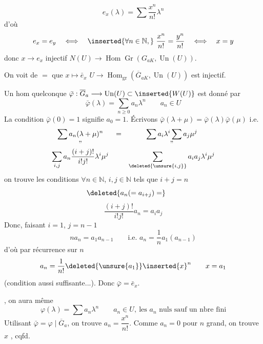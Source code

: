 \[
e_x(\lambda)=\sum\frac{x^n}{n!}\lambda^n
\]
d'où
\[
e_x=e_y\quad\Longleftrightarrow\quad\inserted{\forall n\in\mathbb{N},}\ \frac{x^n}{n!}=\frac{y^n}{n!}\quad\Longleftrightarrow\quad x=y
\]
donc $x\longrightarrow e_x$ injectif $N(U)\longrightarrow\operatorname{Hom}\operatorname{Gr}(G_{aK},\operatorname{Un}(U))$.

On voit de $=$ que $x\longmapsto\bar e_x$ $U\longrightarrow\operatorname{Hom}_{\mathrm{gr}}(\overline G_{aK},\operatorname{Un}(U))$ est injectif.

Un hom quelconque  $\bar\varphi:\overline G_a\longrightarrow\operatorname{Un}(U)\subset\inserted{W(U)}$ est donné par
\[
\bar\varphi(\lambda)=\sum_{n\geq0}a_n\lambda^n\qquad a_n\in U
\]
La condition $\bar\varphi(0)=1$ signifie $a_0=1$. Écrivons $\bar\varphi(\lambda+\mu)=\bar\varphi(\lambda)\bar\varphi(\mu)$ i.e.
\[
\begin{array}{ccc}
\displaystyle\sum a_n(\lambda+\mu)^n&=&\displaystyle\sum a_i\lambda^i\sum a_j\mu^j\\
\text{''}&&\text{''}\\
\displaystyle\sum_{i,j}a_n\frac{(i+j)!}{i!j!}\lambda^i\mu^j&&\displaystyle\sum_{\deleted{\unsure{i,j}}}a_i a_j\lambda^i\mu^j
\end{array}
\]
on trouve les conditions $\forall n\in\mathbb{N}$, $i,j\in\mathbb{N}$ tels que $i+j=n$
\[
\deleted{a_n(=a_{i+j})=}\qquad
\]
\[
\frac{(i+j)!}{i!j!}a_n=a_i a_j
\]
Donc, faisant $i=1$, $j=n-1$
\[
na_n=a_1a_{n-1}\qquad\text{i.e. }a_n=\frac1n a_1(a_{n-1})
\]
d'où par récurrence sur $n$
\[
a_n=\frac1{n!}\deleted{\unsure{a_1}}\inserted{x}^{n}\qquad x=a_1
\]
(condition aussi suffisante...). Donc $\bar\varphi=\bar e_x$.

, on aura même
\[
\varphi(\lambda)=\sum a_n\lambda^n\qquad a_n\in U,\ \text{les }a_n\text{ nuls sauf un nbre fini}
\]
Utilisant $\bar\varphi=\varphi\mid\overline G_a$, on trouve $a_n=\dfrac{x^n}{n!}$. Comme $a_n=0$ pour $n$ grand, on trouve $x$ , cqfd.
